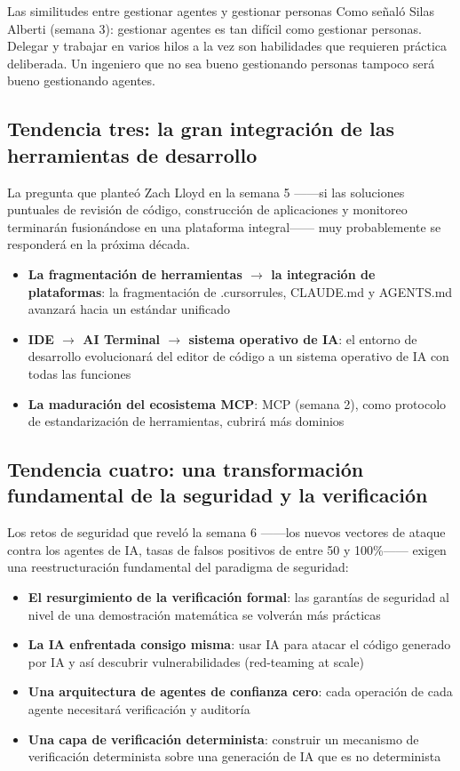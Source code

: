 \begin{knowledgebox}{Las similitudes entre gestionar agentes y gestionar personas}
Como señaló Silas Alberti (semana 3): gestionar agentes es tan difícil como gestionar personas. Delegar y trabajar en varios hilos a la vez son habilidades que requieren práctica deliberada. Un ingeniero que no sea bueno gestionando personas tampoco será bueno gestionando agentes.
\end{knowledgebox}

\subsection{Tendencia tres: la gran integración de las herramientas de desarrollo}

La pregunta que planteó Zach Lloyd en la semana 5 ——si las soluciones puntuales de revisión de código, construcción de aplicaciones y monitoreo terminarán fusionándose en una plataforma integral—— muy probablemente se responderá en la próxima década.

\begin{itemize}
    \item \textbf{La fragmentación de herramientas $\rightarrow$ la integración de plataformas}: la fragmentación de .cursorrules, CLAUDE.md y AGENTS.md avanzará hacia un estándar unificado
    \item \textbf{IDE $\rightarrow$ AI Terminal $\rightarrow$ sistema operativo de IA}: el entorno de desarrollo evolucionará del editor de código a un sistema operativo de IA con todas las funciones
    \item \textbf{La maduración del ecosistema MCP}: MCP (semana 2), como protocolo de estandarización de herramientas, cubrirá más dominios
\end{itemize}

\subsection{Tendencia cuatro: una transformación fundamental de la seguridad y la verificación}

Los retos de seguridad que reveló la semana 6 ——los nuevos vectores de ataque contra los agentes de IA, tasas de falsos positivos de entre 50 y 100\%—— exigen una reestructuración fundamental del paradigma de seguridad:

\begin{itemize}
    \item \textbf{El resurgimiento de la verificación formal}: las garantías de seguridad al nivel de una demostración matemática se volverán más prácticas
    \item \textbf{La IA enfrentada consigo misma}: usar IA para atacar el código generado por IA y así descubrir vulnerabilidades (red-teaming at scale)
    \item \textbf{Una arquitectura de agentes de confianza cero}: cada operación de cada agente necesitará verificación y auditoría
    \item \textbf{Una capa de verificación determinista}: construir un mecanismo de verificación determinista sobre una generación de IA que es no determinista
\end{itemize}

